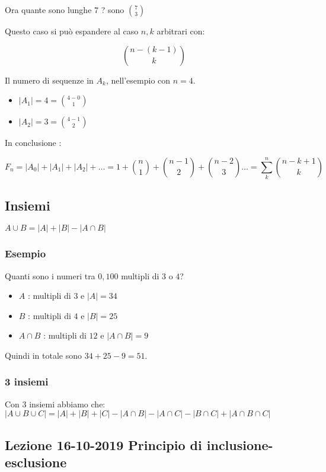 \documentclass[11pt]{article}
\begin{document}
			Ora quante sono lunghe $7$ ? sono $\binom{7}{3}$

			Questo caso si pu\`o espandere al caso $n,k$ arbitrari con:

			\[
				\binom{n-(k-1)}{k}
			\]

			Il numero di sequenze in $A_k$, nell'esempio con  $n=4$.

			\begin{itemize}
				\item $|A_1| = 4 = \binom{4-0}{1}$
				\item $|A_2| = 3 = \binom{4-1}{2}$
			\end{itemize}

			In conclusione :

			\[
				F_n = |A_0| + |A_1| + |A_2| + \ldots =
				1 + \binom{n}{1} + \binom{n-1}{2} + \binom{n-2}{3} \ldots 
				= \sum_{k}^{n} \binom{n-k+1}{k}
			\]
			\subsection{Insiemi}

			$A \cup B = |A| + |B| - |A \cap B|$
			
			\subsubsection{Esempio}

			Quanti sono i numeri tra $0, 100$ multipli di $3$ o $4$?

			\begin{itemize}
			\item $A$ : multipli di $3$ e $|A| = 34$
			\item $B$ : multipli di $4$ e $|B| = 25$
			\item $A \cap B$ : multipli di $12$ e $|A \cap B| = 9$
			\end{itemize}
			
			Quindi in totale sono $34 + 25 - 9 = 51$.
			
			\subsubsection{3 insiemi}

			Con $3$ insiemi abbiamo che:\\

			$|A \cup B \cup C| = |A| + |B| + |C| 
			- |A \cap B| - |A \cap C| - |B \cap C|
			+ |A \cap B \cap C|$

		\subsection{Lezione 16-10-2019 Principio di inclusione-esclusione}
\end{document}
